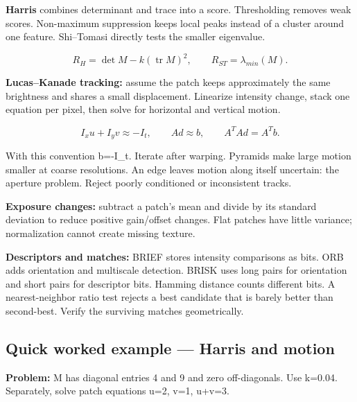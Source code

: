 \documentclass[11pt,letterpaper]{article}
\begin{document}
\textbf{Harris} combines determinant and trace into a score. Thresholding removes weak scores. Non-maximum suppression keeps local peaks instead of a cluster around one feature. Shi–Tomasi directly tests the smaller eigenvalue.



\begin{tcolorbox}\color{MathBlue}\[R_H=\det M-k(\operatorname{tr}M)^2,\qquad R_{ST}=\lambda_{min}(M).\]\end{tcolorbox}


\textbf{Lucas–Kanade tracking:} assume the patch keeps approximately the same brightness and shares a small displacement. Linearize intensity change, stack one equation per pixel, then solve for horizontal and vertical motion.



\begin{tcolorbox}\color{MathBlue}\[I_xu+I_yv\approx-I_t,\qquad Ad\approx b,\qquad A^TAd=A^Tb.\]\end{tcolorbox}


With this convention b=-I\_t. Iterate after warping. Pyramids make large motion smaller at coarse resolutions. An edge leaves motion along itself uncertain: the aperture problem. Reject poorly conditioned or inconsistent tracks.



\textbf{Exposure changes:} subtract a patch's mean and divide by its standard deviation to reduce positive gain/offset changes. Flat patches have little variance; normalization cannot create missing texture.



\textbf{Descriptors and matches:} BRIEF stores intensity comparisons as bits. ORB adds orientation and multiscale detection. BRISK uses long pairs for orientation and short pairs for descriptor bits. Hamming distance counts different bits. A nearest-neighbor ratio test rejects a best candidate that is barely better than second-best. Verify the surviving matches geometrically.



\subsection*{Quick worked example — Harris and motion}


\textbf{Problem:} M has diagonal entries 4 and 9 and zero off-diagonals. Use k=0.04. Separately, solve patch equations u=2, v=1, u+v=3.
\end{document}
